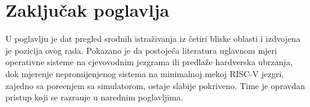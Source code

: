 \section{Zaklju\v{c}ak poglavlja}
\label{sec:srodni-zakljucak}

U poglavlju je dat pregled srodnih istra\v{z}ivanja iz \v{c}etiri bliske oblasti
i izdvojena je pozicija ovog rada. Pokazano je da postoje\'ca literatura uglavnom
mjeri operativne sisteme na cjevovodnim jezgrama ili predla\v{z}e hardverska
ubrzanja, dok mjerenje nepromijenjenog sistema na minimalnoj mekoj RISC-V jezgri,
zajedno sa pore\dj{}enjem sa simulatorom, ostaje slabije pokriveno. Time je
opravdan pristup koji se razra\dj{}uje u narednim poglavljima.

